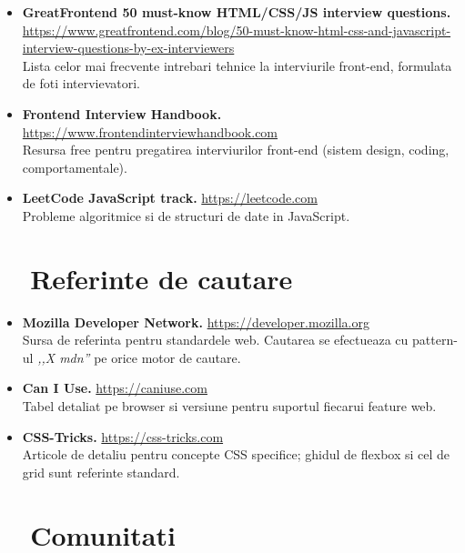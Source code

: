 \begin{itemize}[itemsep=2pt]
  \item \textbf{GreatFrontend \textendash{} 50 must-know HTML/CSS/JS interview questions.} \\\url{https://www.greatfrontend.com/blog/50-must-know-html-css-and-javascript-interview-questions-by-ex-interviewers} \\
  Lista celor mai frecvente intrebari tehnice la interviurile front-end, formulata de foti intervievatori.
  \item \textbf{Frontend Interview Handbook.} \url{https://www.frontendinterviewhandbook.com} \\
  Resursa free pentru pregatirea interviurilor front-end (sistem design, coding, comportamentale).
  \item \textbf{LeetCode \textendash{} JavaScript track.} \url{https://leetcode.com} \\
  Probleme algoritmice si de structuri de date in JavaScript.
\end{itemize}

\section{\faSearch\ \ Referinte de cautare}

\begin{itemize}[itemsep=2pt]
  \item \textbf{Mozilla Developer Network.} \url{https://developer.mozilla.org} \\
  Sursa de referinta pentru standardele web. Cautarea se efectueaza cu pattern-ul \emph{,,X mdn''} pe orice motor de cautare.
  \item \textbf{Can I Use.} \url{https://caniuse.com} \\
  Tabel detaliat pe browser si versiune pentru suportul fiecarui feature web.
  \item \textbf{CSS-Tricks.} \url{https://css-tricks.com} \\
  Articole de detaliu pentru concepte CSS specifice; ghidul de flexbox si cel de grid sunt referinte standard.
\end{itemize}

\section{\faUsers\ \ Comunitati}

